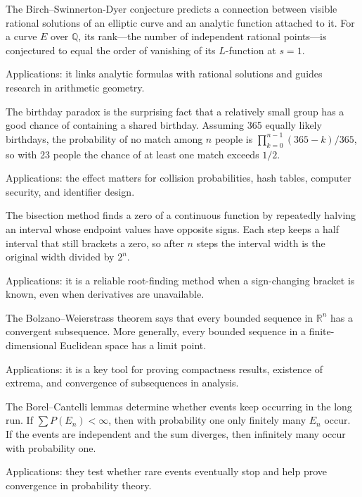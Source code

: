 The Birch--Swinnerton-Dyer conjecture predicts a connection between visible rational solutions of an elliptic curve and an analytic function attached to it. For a curve $E$ over $\mathbb Q$, its rank—the number of independent rational points—is conjectured to equal the order of vanishing of its $L$-function at $s=1$. \par\noindent Applications: it links analytic formulas with rational solutions and guides research in arithmetic geometry.

The birthday paradox is the surprising fact that a relatively small group has a good chance of containing a shared birthday. Assuming 365 equally likely birthdays, the probability of no match among $n$ people is $\prod_{k=0}^{n-1}(365-k)/365$, so with 23 people the chance of at least one match exceeds $1/2$. \par\noindent Applications: the effect matters for collision probabilities, hash tables, computer security, and identifier design.

The bisection method finds a zero of a continuous function by repeatedly halving an interval whose endpoint values have opposite signs. Each step keeps a half interval that still brackets a zero, so after $n$ steps the interval width is the original width divided by $2^n$. \par\noindent Applications: it is a reliable root-finding method when a sign-changing bracket is known, even when derivatives are unavailable.

The Bolzano--Weierstrass theorem says that every bounded sequence in $\mathbb{R}^n$ has a convergent subsequence. More generally, every bounded sequence in a finite-dimensional Euclidean space has a limit point. \par\noindent Applications: it is a key tool for proving compactness results, existence of extrema, and convergence of subsequences in analysis.

The Borel--Cantelli lemmas determine whether events keep occurring in the long run. If $\sum P(E_n)<\infty$, then with probability one only finitely many $E_n$ occur. If the events are independent and the sum diverges, then infinitely many occur with probability one. \par\noindent Applications: they test whether rare events eventually stop and help prove convergence in probability theory.


